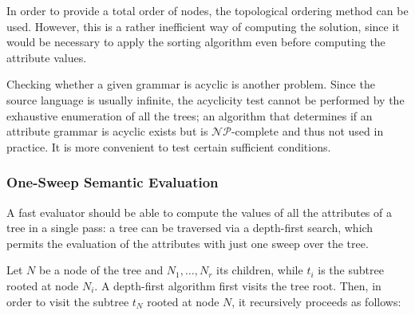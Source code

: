 \documentclass[english]{article}
\begin{document}
In order to provide a total order of nodes, the topological ordering method can be used.
However, this is a rather inefficient way of computing the solution, since it would be necessary to apply the sorting algorithm even before computing the attribute values.

\bigskip
Checking whether a given grammar is acyclic is another problem.
Since the source language is usually infinite, the acyclicity test cannot be performed by the exhaustive enumeration of all the trees;
an algorithm that determines if an attribute grammar is acyclic exists but is \(\mathcal{NP}\)-complete and thus not used in practice.
It is more convenient to test certain sufficient conditions.

\subsubsection{One-Sweep Semantic Evaluation}

A fast evaluator should be able to compute the values of all the attributes of a tree in a single pass:
a tree can be traversed via a depth-first search, which permits the evaluation of the attributes with just one sweep over the tree.

Let \(N\) be a node of the tree and \(N_1, \ldots, N_r\) its children, while \(t_i\) is the subtree rooted at node \(N_i\).
A depth-first algorithm first visits the tree root.
Then, in order to visit the subtree \(t_N\) rooted at node \(N\), it recursively proceeds as follows:
\end{document}

